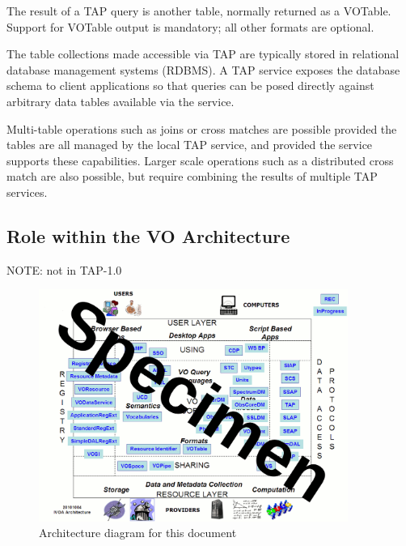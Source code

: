 \documentclass[11pt,a4paper]{ivoa}
\begin{document}
The result of a TAP query is another table, normally returned as a VOTable. 
Support for VOTable output is mandatory; all other formats are optional.

The table collections made accessible via TAP are typically stored in relational 
database management systems (RDBMS). A TAP service exposes the database schema 
to client applications so that queries can be posed directly against arbitrary 
data tables available via the service.

Multi-table operations such as joins or cross matches are possible provided the 
tables are all managed by the local TAP service, and provided the service 
supports these capabilities.  Larger scale operations such as a distributed 
cross match are also possible, but require combining the results of multiple TAP 
services.

\subsection{Role within the VO Architecture}

NOTE: not in TAP-1.0

\begin{figure}
\centering


\includegraphics[width=0.9\textwidth]{archdiag.png}
\caption{Architecture diagram for this document}
\label{fig:archdiag}
\end{figure}
\end{document}
